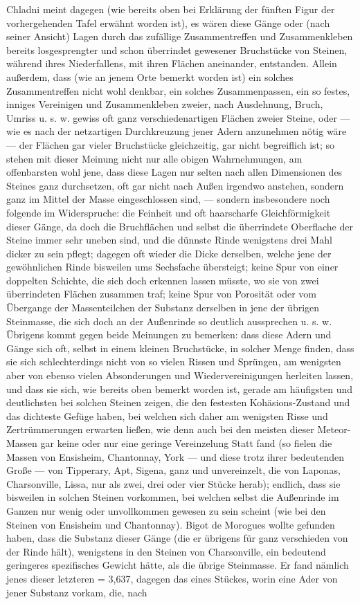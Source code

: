 \documentclass[a4paper, 11pt, oneside, german]{article}
\begin{document}
{Chladni meint dagegen (wie bereits oben bei Erklärung der fünften Figur der vorhergehenden Tafel erwähnt worden ist), es wären diese Gänge oder (nach seiner Ansicht) Lagen durch das zufällige Zusammentreffen und Zusammenkleben bereits losgesprengter und schon überrindet gewesener Bruchstücke von Steinen, während ihres Niederfallens, mit ihren Flächen aneinander, entstanden. Allein außerdem, dass (wie an jenem Orte bemerkt worden ist) ein solches Zusammentreffen nicht wohl denkbar, ein solches Zusammenpassen, ein so festes, inniges Vereinigen und Zusammenkleben zweier, nach Ausdehnung, Bruch, Umriss u. s. w. gewiss oft ganz verschiedenartigen Flächen zweier Steine, oder --- wie es nach der netzartigen Durchkreuzung jener Adern anzunehmen nötig wäre --- der Flächen gar vieler Bruchstücke gleichzeitig, gar nicht begreiflich ist; so stehen mit dieser Meinung nicht nur alle obigen Wahrnehmungen, am offenbarsten wohl jene, dass diese Lagen nur selten nach allen Dimensionen des Steines ganz durchsetzen, oft gar nicht nach Außen irgendwo anstehen, sondern ganz im Mittel der Masse eingeschlossen sind, --- sondern insbesondere noch folgende im Widerspruche: die Feinheit und oft haarscharfe Gleichförmigkeit dieser Gänge, da doch die Bruchflächen und selbst die überrindete Oberflache der Steine immer sehr uneben sind, und die dünnste Rinde wenigstens drei Mahl dicker zu sein pflegt; dagegen oft wieder die Dicke derselben, welche jene der gewöhnlichen Rinde bisweilen ums Sechsfache übersteigt; keine Spur von einer doppelten Schichte, die sich doch erkennen lassen müsste, wo sie von zwei überrindeten Flächen zusammen traf; keine Spur von Porosität oder vom Übergange der Massenteilchen der Substanz derselben in jene der übrigen Steinmasse, die sich doch an der Außenrinde so deutlich aussprechen u. s. w. Übrigens kommt gegen beide Meinungen zu bemerken: dass diese Adern und Gänge sich oft, selbst in einem kleinen Bruchstücke, in solcher Menge finden, dass sie sich schlechterdings nicht von so vielen Rissen und Sprüngen, am wenigsten aber von ebenso vielen Absonderungen und Wiedervereinigungen herleiten lassen, und dass sie sich, wie bereits oben bemerkt worden ist, gerade am häufigsten und deutlichsten bei solchen Steinen zeigen, die den festesten Kohäsions-Zustand und das dichteste Gefüge haben, bei welchen sich daher am wenigsten Risse und Zertrümmerungen erwarten ließen, wie denn auch bei den meisten dieser Meteor-Massen gar keine oder nur eine geringe Vereinzelung Statt fand (so fielen die Massen von Ensisheim, Chantonnay, York --- und diese trotz ihrer bedeutenden Große --- von Tipperary, Apt, Sigena, ganz und unvereinzelt, die von Laponas, Charsonville, Lissa, nur als zwei, drei oder vier Stücke herab); endlich, dass sie bisweilen in solchen Steinen vorkommen, bei welchen selbst die Außenrinde im Ganzen nur wenig oder unvollkommen gewesen zu sein scheint (wie bei den Steinen von Ensisheim und Chantonnay). Bigot de Morogues wollte gefunden haben, dass die Substanz dieser Gänge (die er übrigens für ganz verschieden von der Rinde hält), wenigstens in den Steinen von Charsonville, ein bedeutend geringeres spezifisches Gewicht hätte, als die übrige Steinmasse. Er fand nämlich jenes dieser letzteren = 3,637, dagegen das eines Stückes, worin eine Ader von jener Substanz vorkam, die, nach }
\end{document}
